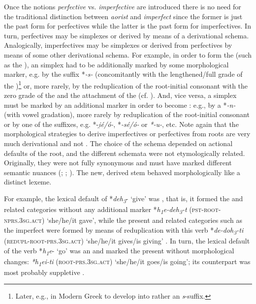 \documentclass[output=paper]{langsci/langscibook}
\begin{document}
Once the notions \textit{perfective} vs. \textit{imperfective} are introduced there is no need for the traditional distinction between \textit{aorist} and \textit{imperfect} since the former is just the past form for perfectives while the latter is the past form for imperfectives. In turn, perfectives may be simplexes or derived by means of a derivational schema. Analogically, imperfectives may be simplexes or derived from perfectives by means of some other derivational schema. For example, in order to form the  (such as the ), an  simplex had to be additionally marked by some morphological marker, e.g. by the suffix *\textit{-s-} (concomitantly with the lengthened/full grade of the )\footnote{Later, e.g., in Modern Greek to develop into rather an  \textit{s}-suffix.} or, more rarely, by the reduplication of the root-initial consonant with the zero grade of the  and the attachment of the  (cf. \citealt[21]{LIV2001}). And, vice versa, a  simplex must be marked by an additional marker in order to become : e.g., by a  *\textit{-n-} (with vowel gradation), more rarely by reduplication of the root-initial consonant or by one of the suffixes, e.g.   *-\textit{{i}̯é/ó-}, *\textit{-sé/ó-} or \textit{*-u-}, etc. Note again that the morphological strategies to derive imperfectives or perfectives from roots are very much derivational and not . The choice of the schema depended on actional defaults of the root, and the different schemata were not etymologically related. Originally, they were not fully synonymous and must have marked different semantic nuances (\citealt{Meiser1993}; \citealt{Kölligan2004}; \citealt[115]{Seržant2014}). The new, derived stem behaved morphologically like a distinct lexeme.

For example, the lexical default of *\textit{deh\textsubscript{3}}- ‘give’ was , that is, it formed the  and related categories without any additional marker *\textit{h\textsubscript{1}e-deh\textsubscript{3}-t} (\textsc{pst-root}-\textsc{nprs.3sg.act)} ‘she/he/it gave’, while the present and related categories such as the imperfect were formed by means of reduplication with this verb *\textit{de-doh\textsubscript{3}-ti} (\textsc{redupl-root}-\textsc{prs.3sg.act)} ‘she/he/it gives/is giving’ \citep[105]{LIV2001}. In turn, the lexical default of the verb *\textit{h\textsubscript{1}e}- ‘go’ was an  and marked the present without morphological changes: \textit{*h\textsubscript{1}ei-ti} (\textsc{root}-\textsc{prs.3sg.act)} ‘she/he/it goes/is going’; its  counterpart was most probably suppletive \citep[232]{LIV2001}. 
\end{document}
